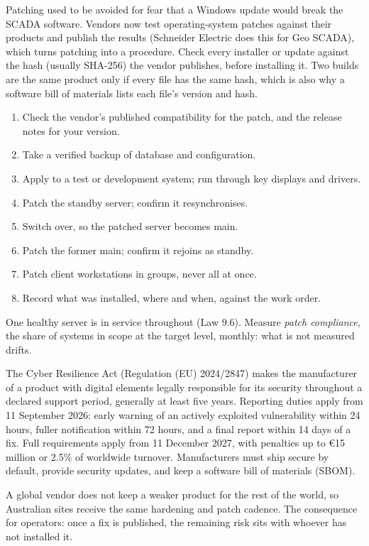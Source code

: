 Patching used to be avoided for fear that a Windows update would break the SCADA software. Vendors now test operating-system patches against their products and publish the results (Schneider Electric does this for Geo SCADA), which turns patching into a procedure.
 Check every installer or update against the hash (usually SHA-256) the vendor publishes, before installing it. Two builds are the same product only if every file has the same hash, which is also why a software bill of materials lists each file's version and hash.

\begin{enumerate}
\item Check the vendor's published compatibility for the patch, and the release notes for your version.
\item Take a verified backup of database and configuration.
\item Apply to a test or development system; run through key displays and drivers.
\item Patch the standby server; confirm it resynchronises.
\item Switch over, so the patched server becomes main.
\item Patch the former main; confirm it rejoins as standby.
\item Patch client workstations in groups, never all at once.
\item Record what was installed, where and when, against the work order.
\end{enumerate}
One healthy server is in service throughout (Law 9.6). Measure \emph{patch compliance}, the share of systems in scope at the target level, monthly: what is not measured drifts.

The Cyber Resilience Act (Regulation (EU) 2024/2847) makes the manufacturer of a product with digital elements legally responsible for its security throughout a declared support period, generally at least five years. Reporting duties apply from 11 September 2026: early warning of an actively exploited vulnerability within 24 hours, fuller notification within 72 hours, and a final report within 14 days of a fix. Full requirements apply from 11 December 2027, with penalties up to €15 million or 2.5\% of worldwide turnover. Manufacturers must ship secure by default, provide security updates, and keep a software bill of materials (SBOM).

A global vendor does not keep a weaker product for the rest of the world, so Australian sites receive the same hardening and patch cadence. The consequence for operators: once a fix is published, the remaining risk sits with whoever has not installed it.

